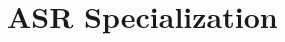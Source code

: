 \documentclass{llmxive}
\begin{document}

\section{ASR Specialization}
\label{sec:asr}



\end{document}
